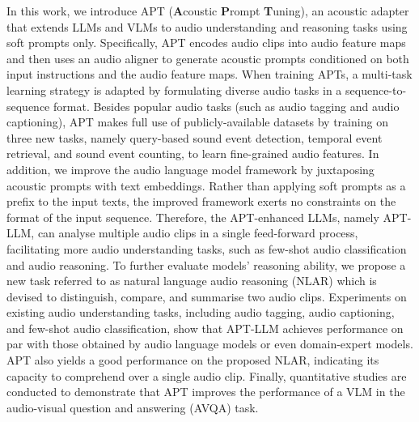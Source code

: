 \documentclass{article} %
\begin{document}
In this work, we introduce APT (\textbf{A}coustic \textbf{P}rompt \textbf{T}uning), an acoustic adapter that extends LLMs and VLMs to audio understanding and reasoning tasks using soft prompts only. Specifically, APT encodes audio clips into audio feature maps and then uses an audio aligner to generate acoustic prompts conditioned on both input instructions and the audio feature maps. When training APTs, a multi-task learning strategy is adapted by formulating diverse audio tasks in a sequence-to-sequence format. Besides popular audio tasks (such as audio tagging and audio captioning), APT makes full use of publicly-available datasets by training on three new tasks, namely query-based sound event detection, temporal event retrieval, and sound event counting, to learn fine-grained audio features. In addition, we improve the audio language model framework by juxtaposing acoustic prompts with text embeddings. Rather than applying soft prompts as a prefix to the input texts, the improved framework exerts no constraints on the format of the input sequence. Therefore, the APT-enhanced LLMs, namely APT-LLM, can analyse multiple audio clips in a single feed-forward process, facilitating more audio understanding tasks, such as few-shot audio classification and audio reasoning. To further evaluate models' reasoning ability, we propose a new task referred to as natural language audio reasoning (NLAR) which is devised to distinguish, compare, and summarise two audio clips. Experiments on existing audio understanding tasks, including audio tagging, audio captioning, and few-shot audio classification, show that APT-LLM achieves performance on par with those obtained by audio language models or even domain-expert models. APT also yields a good performance on the proposed NLAR, indicating its capacity to comprehend over a single audio clip. Finally, quantitative studies are conducted to demonstrate that APT improves the performance of a VLM in the audio-visual question and answering (AVQA) task.
\end{document}
